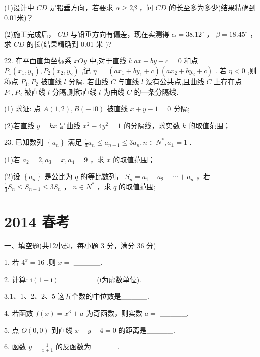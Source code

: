 \documentclass[10pt]{article}
\begin{document}
(1)设计中 \({CD}\) 是铅垂方向，若要求 \(\alpha  \geq  {2\beta }\) ，问 \({CD}\) 的长至多为多少(结果精确到 0.01米)？

(2)施工完成后， \({CD}\) 与铅垂方向有偏差，现在实测得 \(\alpha  = {38.12}^{ \circ  }\) ， \(\beta  = {18.45}^{ \circ  }\) ，求 \({CD}\) 的长(结果精确到 0.01 米 )?

22. 在平面直角坐标系 \({xOy}\) 中,对于直线 \(l : {ax} + {by} + c = 0\) 和点 \({P}_{1}\left( {{x}_{1},{y}_{1}}\right) ,{P}_{2}\left( {{x}_{2},{y}_{2}}\right)\) ,记 \(\eta  = \; \left( {a{x}_{1} + b{y}_{1} + c}\right) \left( {a{x}_{2} + b{y}_{2} + c}\right)\) . 若 \(\eta  < 0\) ,则称点 \({P}_{1},{P}_{2}\) 被直线 \(l\) 分隔. 若曲线 \(C\) 与直线 \(l\) 没有公共点,且曲线 \(C\) 上存在点 \({P}_{1},{P}_{2}\) 被直线 \(l\) 分隔,则称直线 \(l\) 为曲线 \(C\) 的一条分隔线.

(1) 求证: 点 \(A\left( {1,2}\right) ,B\left( {-{10}}\right)\) 被直线 \(x + y - 1 = 0\) 分隔;

(2)若直线 \(y = {kx}\) 是曲线 \({x}^{2} - 4{y}^{2} = 1\) 的分隔线，求实数 \(k\) 的取值范围；

23. 已知数列 \(\left\{  {a}_{n}\right\}\) 满足 \(\frac{1}{3}{a}_{n} \leq  {a}_{n + 1} \leq  3{a}_{n},n \in  {N}^{ * },{a}_{1} = 1\) .

(1)若 \({a}_{2} = 2,{a}_{3} = x,{a}_{4} = 9\) ，求 \(x\) 的取值范围；

(2)设 \(\left\{  {a}_{n}\right\}\) 是公比为 \(q\) 的等比数列， \({S}_{n} = {a}_{1} + {a}_{2} + \cdots  + {a}_{n}\) ，若 \(\frac{1}{3}{S}_{n} \leq  {S}_{n + 1} \leq  3{S}_{n}\) ， \(n \in  {N}^{ * }\) ，求 \(q\) 的取值范围;

\section*{2014 春考}

一、填空题(共12小题，每小题 3 分，满分 36 分)

1. 若 \({4}^{x} = {16}\) ,则 \(x =\) \_\_\_\_\_.

2. 计算: \(\mathrm{i}\left( {1 + \mathrm{i}}\right)  =\) \_\_\_\_\_(i为虚数单位).

3.1、1、2、2、5 这五个数的中位数是\_\_\_\_\_.

4. 若函数 \(f\left( x\right)  = {x}^{3} + a\) 为奇函数，则实数 \(a =\) \_\_\_\_\_.

5. 点 \(O\left( {0,0}\right)\) 到直线 \(x + y - 4 = 0\) 的距离是\_\_\_\_\_.

6. 函数 \(y = \frac{1}{x + 1}\) 的反函数为\_\_\_\_\_.
\end{document}
